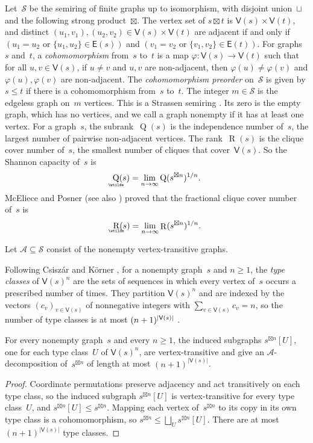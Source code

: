 \documentclass[11pt,letterpaper]{article}
\DeclareMathOperator{\subrank}{Q}
\DeclareMathOperator{\asympsubrank}{\underaccent{\wtilde}{Q}}
\DeclareMathOperator{\asymprank}{\underaccent{\wtilde}{R}}
\DeclareMathOperator{\tensorrank}{R}
\begin{document}
Let~$\mathcal{S}$ be the semiring of finite graphs up to isomorphism, with disjoint union~$\sqcup$ and the following strong product~$\boxtimes$. The vertex set of $s \boxtimes t$ is $\mathsf{V}(s) \times \mathsf{V}(t)$, and distinct $(u_1,v_1), (u_2,v_2) \in \mathsf{V}(s) \times \mathsf{V}(t)$ are adjacent if and only if $(u_1 = u_2 \text{ or } \{u_1,u_2\} \in \mathsf{E}(s))$ and $(v_1 = v_2 \text{ or } \{v_1,v_2\} \in \mathsf{E}(t))$. For graphs~$s$ and~$t$, a \emph{cohomomorphism} from~$s$ to~$t$ is a map $\varphi : \mathsf{V}(s) \to \mathsf{V}(t)$ such that for all $u, v \in \mathsf{V}(s)$, if $u \neq v$ and $u, v$ are non-adjacent, then $\varphi(u) \neq \varphi(v)$ and $\varphi(u), \varphi(v)$ are non-adjacent. The \emph{cohomomorphism preorder} on~$\mathcal{S}$ is given by $s \leq t$ if there is a cohomomorphism from~$s$ to~$t$. The integer $m \in \mathcal{S}$ is the edgeless graph on~$m$ vertices. This is a Strassen semiring \cite{MR4039606}. Its zero is the empty graph, which has no vertices, and we call a graph nonempty if it has at least one vertex. For a graph~$s$, the subrank~$\subrank(s)$ is the independence number of~$s$, the largest number of pairwise non-adjacent vertices. The rank~$\tensorrank(s)$ is the clique cover number of~$s$, the smallest number of cliques that cover~$\mathsf{V}(s)$. So the Shannon capacity of~$s$ \cite{MR0089131} is
\[
\asympsubrank(s) = \lim_{n \to \infty} \subrank(s^{\boxtimes n})^{1/n}.
\]
McEliece and Posner \cite[Theorem~1]{MR403804} (see also \cite[Theorem~67.17]{MR1956925}) proved that the fractional clique cover number of~$s$ is
\[
\asymprank(s) = \lim_{n \to \infty} \tensorrank(s^{\boxtimes n})^{1/n}.
\] 

Let $\mathcal{A} \subseteq \mathcal{S}$ consist of the nonempty vertex-transitive graphs.

Following Csisz\'ar and K\"orner \cite[Definition~2.1]{MR2839250}, for a nonempty graph~$s$ and $n \geq 1$, the \emph{type classes} of $\mathsf{V}(s)^n$ are the sets of sequences in which every vertex of~$s$ occurs a prescribed number of times. They partition $\mathsf{V}(s)^n$ and are indexed by the vectors $(c_v)_{v \in \mathsf{V}(s)}$ of nonnegative integers with $\sum_{v \in \mathsf{V}(s)} c_v = n$, so the number of type classes is at most $(n+1)^{\smash{|\mathsf{V}(s)|}}$ \cite[Lemma~2.2]{MR2839250}.

\begin{lemma}\label{lem:graph-types}
For every nonempty graph~$s$ and every $n \geq 1$, the induced subgraphs $s^{\boxtimes n}[U]$, one for each type class~$U$ of $\mathsf{V}(s)^n$, are vertex-transitive and give an $\mathcal{A}$-decomposition of~$s^{\boxtimes n}$ of length at most $(n+1)^{|\mathsf{V}(s)|}$.
\end{lemma}
\begin{proof}
Coordinate permutations preserve adjacency and act transitively on each type class, so the induced subgraph $s^{\boxtimes n}[U]$ is vertex-transitive for every type class~$U$, and $s^{\boxtimes n}[U] \leq s^{\boxtimes n}$. Mapping each vertex of~$s^{\boxtimes n}$ to its copy in its own type class is a cohomomorphism, so $s^{\boxtimes n} \leq \bigsqcup_U s^{\boxtimes n}[U]$. There are at most $(n+1)^{|\mathsf{V}(s)|}$ type classes.
\end{proof}
\end{document}
